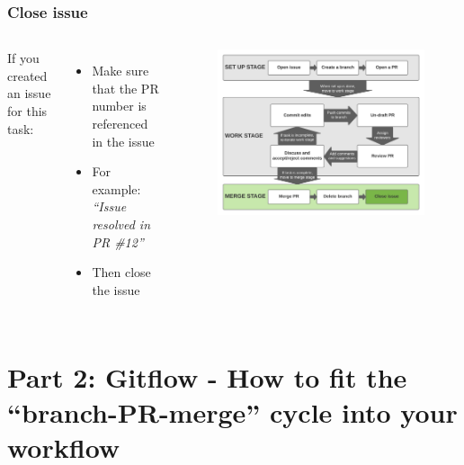 \documentclass[aspectratio=169]{beamer} %
\begin{document}
\begin{frame}
	\frametitle{Close issue}
	\begin{columns}[c]

		If you created an issue for this task:
		\begin{itemize}
			\setlength\itemsep{.5em}
			\item Make sure that the PR number is referenced in the issue
			\item For example: \textit{``Issue resolved in PR \#12''}
			\item Then close the issue
		\end{itemize}

		\vspace{-.75cm}
		\begin{figure}
			\centering
			\includegraphics[width=\textwidth]{./img/branch-pr-merge-cycle-S3-3.png}
		\end{figure}

	\end{columns}
\end{frame}



\section{Part 2: \newline Gitflow - How to fit the ``branch-PR-merge'' cycle into your workflow}
\end{document}
